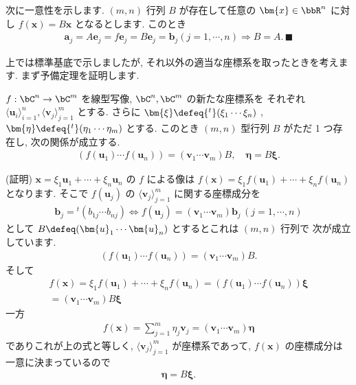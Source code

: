\documentclass[openany, a4paper, oneside]{jsbook}
\begin{document}
次に一意性を示します.
 $(m,n)$ 行列 $B$ が存在して任意の $\bm{x}\in\bbR^n$ に対し $f ( \bm{x} ) = B \bm{x}$ となるとします.
このとき
\begin{align}
    \bm{a}_j
    =
    A \bm{e}_j
    =
    f \bm{e}_j
    =
    B \bm{e}_j
    =
    \bm{b}_j
    ( j = 1 , \dotsb , n )
    \Rightarrow
    B = A. \, \blacksquare
\end{align}

上では標準基底で示しましたが, それ以外の適当な座標系を取ったときを考えます.
まず予備定理を証明します.
\begin{thm}
 $f : \bC^n \to \bC^m$ を線型写像,  $\bC^n, \bC^m$ の新たな座標系を
 それぞれ $\langle \bm{u}_i \rangle _{i=1}^n,\langle \bm{v}_j \rangle _{j=1}^m$
 とする.
 さらに $\bm{\xi} \defeq {^t} ( \xi_1 \dotsb \xi_n )$ ,  $\bm{\eta} \defeq {^t} ( \eta_1 \dotsb \eta_m)$ とする.
 このとき $(m,n)$ 型行列 $B$ がただ 1 つ存在し, 次の関係が成立する.
 \begin{align}
  ( f ( \bm{u}_1 ) \dotsb f ( \bm{u}_n ) )
  =
  ( \bm{v}_1 \dotsb \bm{v}_m) B, \quad
  \bm{\eta}
  =
  B \bm{\xi} .
 \end{align}
\end{thm}
(証明)
$\bm{x} = \xi_1 \bm{u}_1 + \dotsb + \xi_n \bm{u}_n$ の $f$ による像は
$f ( \bm{x} ) = \xi_1 f ( \bm{u}_1 ) + \dotsb + \xi_n f ( \bm{u}_n )$ となります.
そこで $f (\bm{u}_j)$ の $\langle \bm{v}_j \rangle _{j=1}^m$ に関する座標成分を
\begin{align}
    \bm{b}_j
    =
    {^t} ( b_{1j} \dotsb b_{n j} )
    \Longleftrightarrow
    f ( \bm{u}_j )
    =
    ( \bm{v}_1 \dotsb \bm{v}_m ) \bm{b}_j
     \, ( j = 1 , \dotsb , n )
\end{align}
として $B \defeq ( \bm{u}_1 \dotsb \bm{u}_n )$ とするとこれは $(m,n)$ 行列で
次が成立しています.
\begin{align}
    ( f ( \bm{u}_1 ) \dotsb f ( \bm{u}_n ) )
    =
    ( \bm{v}_1 \dotsb \bm{v}_m ) B .
\end{align}
そして
\begin{gather}
    f ( \bm{x} )
    =
    \xi_1 f ( \bm{u}_1 ) + \dotsb + \xi_n f ( \bm{u}_n )
    =
    ( f ( \bm{u}_1 ) \dotsb f ( \bm{u}_n ) ) \bm{\xi} \\
    =
    ( \bm{v}_1 \dotsb \bm{v}_m ) B \bm{\xi}
\end{gather}
一方
\begin{gather}
    f ( \bm{x} )
    =
    \sum_{j=1}^m \eta_j \bm{v}_j
    =
    ( \bm{v}_1 \dotsb \bm{v}_m ) \bm{\eta}
\end{gather}
でありこれが上の式と等しく,  $\langle \bm{v}_j \rangle _{j=1}^m$ が座標系であって,
 $f ( \bm{x} )$ の座標成分は一意に決まっているので
\begin{gather}
    \bm{\eta}
    =
    B \bm{\xi} .
\end{gather}
\end{document}
